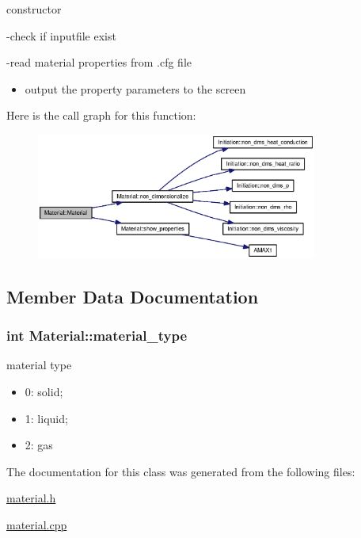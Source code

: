 constructor 



-check if inputfile exist

-read material properties from .cfg file

\begin{itemize}
\item output the property parameters to the screen \end{itemize}


Here is the call graph for this function:\nopagebreak
\begin{figure}[H]
\begin{center}
\leavevmode
\includegraphics[width=262pt]{classMaterial_16e68aae88c0ecd98a88654e4648aa75_cgraph}
\end{center}
\end{figure}


\subsection{Member Data Documentation}
\hypertarget{classMaterial_4eaab2babdbe6e6338cf094bfefb6b2e}{
\subsubsection[{material\_\-type}]{\setlength{\rightskip}{0pt plus 5cm}int {\bf Material::material\_\-type}}}
\label{classMaterial_4eaab2babdbe6e6338cf094bfefb6b2e}


material type 

\begin{itemize}
\item 0: solid;\item 1: liquid;\item 2: gas \end{itemize}


The documentation for this class was generated from the following files:\begin{CompactItemize}
\item 
\hyperlink{material_8h}{material.h}\item 
\hyperlink{material_8cpp}{material.cpp}\end{CompactItemize}
